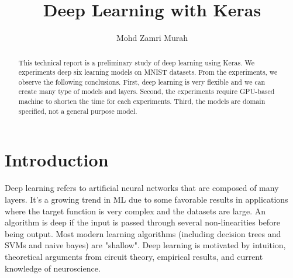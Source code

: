 \documentclass{svproc}
\begin{document}
\mainmatter              %
%
\title{Deep Learning with Keras}
%
%
\author{Mohd Zamri Murah}
%
%
%

\maketitle              %

\begin{abstract}
This technical report is a preliminary study of deep learning using Keras. We experiments deep six learning models on MNIST datasets. From the experiments, we observe the following conclusions. First, deep learning is very flexible and we can create many type of models and layers. Second, the experiments require GPU-based machine to shorten the time for each experiments. Third, the models are domain specified, not a general purpose model.

\end{abstract}
%
\section{Introduction}
%

Deep learning refers to artificial neural networks that are composed of many layers. 
It's a growing trend in ML due to some favorable results in applications where the target function is very complex and the datasets are large\cite{hinton2012improving}. An algorithm is deep if the input is passed through several non-linearities before being output. Most modern learning algorithms (including decision trees and SVMs and naive bayes) are "shallow". Deep learning is motivated by intuition, theoretical arguments from circuit theory, empirical results, and current knowledge of neuroscience.
\end{document}
